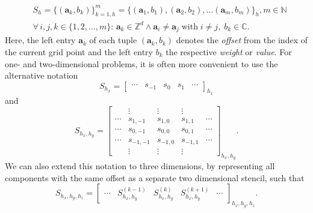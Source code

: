 \begin{equation}
	\begin{split}
			& S_h = \{(\bm{a}_k, b_k) \}_{k=1, h}^m = \{(\bm{a}_1, b_1),  (\bm{a}_2, b_2), \dots (\bm{a}_m, b_m)\}_h, m \in \mathbb{N}
	\\ & \forall \, i, j, k \in \{1, 2, \dots, m \}: \,
	\bm{a}_k \in \mathbb{Z}^d \wedge \bm{a}_i \neq \bm{a}_j \; \text{with} \; i \neq j, \; b_k \in \mathbb{C}.
	\end{split}
\end{equation}
Here, the left entry $\bm{a}_k$ of each tuple $(\bm{a}_k, b_k)$ denotes the \emph{offset} from the index of the current grid point and the left entry $b_k$ the respective \emph{weight} or \emph{value}.
For one- and two-dimensional problems, it is often more convenient to use the alternative notation 
\begin{equation}
	S_{h_x} = \begin{bmatrix}
		\cdots & s_{-1} & s_{0} & s_{1} & \cdots
	\end{bmatrix}_{h_x}
\end{equation}
and
\begin{equation}
	S_{h_x, h_y} = \begin{bmatrix}
		& \vdots & \vdots & \vdots & \\
		\cdots & s_{1,-1} & s_{1,0} & s_{1,1} & \cdots \\
		\cdots & s_{0,-1} & s_{0,0} & s_{0,1} & \cdots \\
		\cdots & s_{-1,-1} & s_{-1,0} & s_{-1,1} & \cdots \\
		& \vdots & \vdots & \vdots &
	\end{bmatrix}_{h_x, h_y}.
\end{equation}
We can also extend this notation to three dimensions, by representing all components with the same offset as a separate two dimensional stencil, such that
\begin{equation}
	S_{h_x, h_y, h_z} = 
	\begin{bmatrix}
		\cdots & S_{h_x, h_y}^{(k-1)} & S_{h_x, h_y}^{(k)} & S_{h_x, h_y}^{(k+1)} & \cdots 
	\end{bmatrix}_{h_x, h_y, h_z}.
\label{eq:3D-stencil-matrix-notation}
\end{equation}

